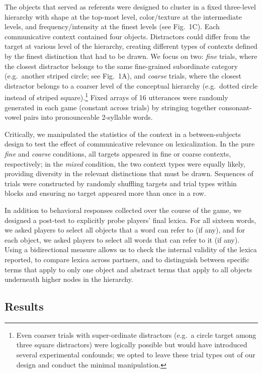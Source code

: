 \documentclass[10pt,letterpaper]{article}
\begin{document}
The objects that served as referents were designed to cluster in a fixed three-level hierarchy with shape at the top-most level, color/texture at the intermediate levels, and frequency/intensity at the finest levels (see Fig.\ 1C). Each communicative context contained four objects. Distractors could differ from the target at various level of the hierarchy, creating different types of contexts defined by the finest distinction that had to be drawn. We focus on two: \emph{fine} trials, where the closest distractor belongs to the same fine-grained subordinate category (e.g.\ another striped circle; see Fig.\ 1A), and \emph{coarse} trials, where the closest distractor belongs to a coarser level of the conceptual hierarchy (e.g.\ dotted circle instead of striped square).\footnote{Even coarser trials with super-ordinate distractors (e.g.\ a circle target among three square distractors) were logically possible but would have introduced several experimental confounds; we opted to leave these trial types out of our design and conduct the minimal manipulation.} Fixed arrays of 16 utterances were randomly generated in each game (constant across trials) by stringing together consonant-vowel pairs into pronounceable 2-syllable words.

Critically, we manipulated the statistics of the context in a between-subjects design to test the effect of communicative relevance on lexicalization. In the pure \emph{fine} and \emph{coarse} conditions, all targets appeared in fine or coarse contexts, respectively; in the \emph{mixed} condition, the two context types were equally likely, providing diversity in the relevant distinctions that must be drawn. Sequences of trials were constructed by randomly shuffling targets and trial types within blocks and ensuring no target appeared more than once in a row. 

In addition to behavioral responses collected over the course of the game, we designed a post-test to explicitly probe players' final lexica. For all sixteen words, we asked players to select all objects that a word can refer to (if any), and for each object, we asked players to select all words that can refer to it (if any). Using a bidirectional measure allows us to check the internal validity of the lexica reported, to compare lexica across partners, and to distinguish between specific terms that apply to only one object and abstract terms that apply to all objects underneath higher nodes in the hierarchy. 

\subsection{Results}
\end{document}
